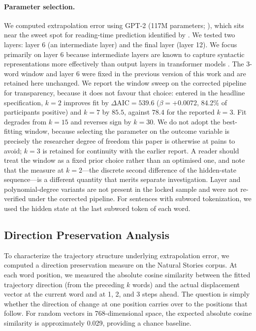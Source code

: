\documentclass[12pt]{article}
\newcommand{\new}[1]{#1}   %
\begin{document}
\paragraph{Parameter selection.} We computed extrapolation error using GPT-2 (117M parameters; \citealp{radford2019}), which sits near the sweet spot for reading-time prediction identified by \citet{oh2023a}. We tested two layers: layer 6 (an intermediate layer) and the final layer (layer 12). We focus primarily on layer 6 because intermediate layers are known to capture syntactic representations more effectively than output layers in transformer models \citep{hewitt2019,jawahar2019}. \new{The 3-word window and layer 6 were fixed in the previous version of this work and are retained here unchanged. We report the window sweep on the corrected pipeline for transparency, because it does not favour that choice: entered in the headline specification, $k = 2$ improves fit by $\Delta\text{AIC} = 539.6$ ($\beta = +0.0072$, 84.2\% of participants positive) and $k = 7$ by $85.5$, against $78.4$ for the reported $k = 3$. Fit degrades from $k = 15$ and reverses sign by $k = 30$. We do not adopt the best-fitting window, because selecting the parameter on the outcome variable is precisely the researcher degree of freedom this paper is otherwise at pains to avoid; $k = 3$ is retained for continuity with the earlier report. A reader should treat the window as a fixed prior choice rather than an optimised one, and note that the measure at $k = 2$---the discrete second difference of the hidden-state sequence---is a different quantity that merits separate investigation. Layer and polynomial-degree variants are not present in the locked sample and were not re-verified under the corrected pipeline.} For sentences with subword tokenization, we used the hidden state at the last subword token of each word.

\subsection{Direction Preservation Analysis}

To characterize the trajectory structure underlying extrapolation error, we computed a direction preservation measure on the Natural Stories corpus. At each word position, we measured the absolute cosine similarity between the fitted trajectory direction (from the preceding $k$ words) and the actual displacement vector at the current word and at 1, 2, and 3 steps ahead. The question is simply whether the direction of change at one position carries over to the positions that follow. For random vectors in 768-dimensional space, the expected absolute cosine similarity is approximately 0.029, providing a chance baseline.
\end{document}

